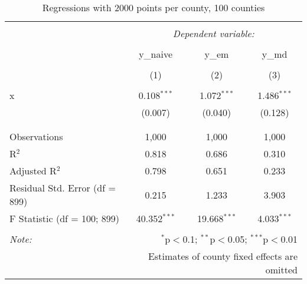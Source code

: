 
\begin{table}[!htbp] \centering 
  \caption{Regressions with 2000 points per county, 100 counties} 
  \label{} 
\begin{tabular}{@{\extracolsep{5pt}}lccc} 
\\[-1.8ex]\hline 
\hline \\[-1.8ex] 
 & \multicolumn{3}{c}{\textit{Dependent variable:}} \\ 
\cline{2-4} 
\\[-1.8ex] & y\_naive & y\_em & y\_md \\ 
\\[-1.8ex] & (1) & (2) & (3)\\ 
\hline \\[-1.8ex] 
 x & 0.108$^{***}$ & 1.072$^{***}$ & 1.486$^{***}$ \\ 
  & (0.007) & (0.040) & (0.128) \\ 
  & & & \\ 
\hline \\[-1.8ex] 
Observations & 1,000 & 1,000 & 1,000 \\ 
R$^{2}$ & 0.818 & 0.686 & 0.310 \\ 
Adjusted R$^{2}$ & 0.798 & 0.651 & 0.233 \\ 
Residual Std. Error (df = 899) & 0.215 & 1.233 & 3.903 \\ 
F Statistic (df = 100; 899) & 40.352$^{***}$ & 19.668$^{***}$ & 4.033$^{***}$ \\ 
\hline 
\hline \\[-1.8ex] 
\textit{Note:}  & \multicolumn{3}{r}{$^{*}$p$<$0.1; $^{**}$p$<$0.05; $^{***}$p$<$0.01} \\ 
 & \multicolumn{3}{r}{Estimates of county fixed effects are omitted} \\ 
\end{tabular} 
\end{table} 
